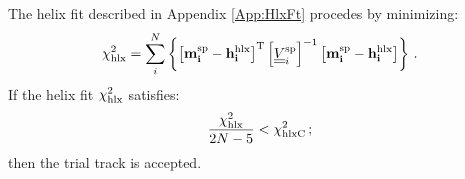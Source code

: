 The helix fit described in Appendix \ref{App:HlxFt} procedes by
minimizing:
\begin{equation}
  \chi^2_{\rm hlx} = 
    \sum_i^N \left\{
      \left[ {\bf m^{\rm sp}_i} - {\bf h^{\rm hlx}_i} \right]^{\rm T}
      \left[ \underline{\underline{V}}^{\rm sp}_i \right]^{-1}
      \left[ {\bf m^{\rm sp}_i} - {\bf h^{\rm hlx}_i} \right] 
  \right\}\, .
\end{equation}
If the helix fit $\chi^2_{\rm hlx}$ satisfies: 
\begin{equation}
  \frac{\chi^2_{\rm hlx}}{2N-5} < \chi^2_{\rm hlx C} \, ;
\end{equation}
then the trial track is accepted.
